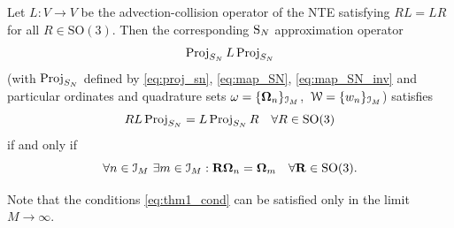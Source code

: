  
\begin{theorem*}\label{thm:commut_NTE}
Let $L : V\to V$ be the advection-collision operator of the NTE satisfying
$RL = LR$ for all $R\in\mathrm{SO}(3)$. 
Then the corresponding $\SN$ approximation operator
\begin{equation}\label{eq:sn_op_app}
	\Projop[S_N]\op{L}\Projop[S_N]
\end{equation}
(with $\Projop[S_N]$ defined by \eqref{eq:proj_sn}, \eqref{eq:map_SN}, \eqref{eq:map_SN_inv} and particular
ordinates and quadrature sets \mbox{$\omega = \{\bomega_n\}_{\idxset{M}}$, $\mathcal{W} = \{w_n\}_{\idxset{M}}$})
satisfies $$
\op{R}\op{L}\Projop[S_N] = \op{L}\Projop[S_N]\op{R}\quad \forall R\in\mathrm{SO}(3)
$$
if and only if
\begin{equation}\label{eq:thm1_cond}
	\forall n\in \idxset{M}\ \exists m\in\idxset{M}: \mat{R}\bomega_n = \bomega_m \quad \forall \mat{R}\in\mathrm{SO}(3).
\end{equation} 
\end{theorem*}
\begin{remark*}
	Note that the conditions \eqref{eq:thm1_cond} can be satisfied only in the limit \mbox{$M\to\infty$}.
\end{remark*}
